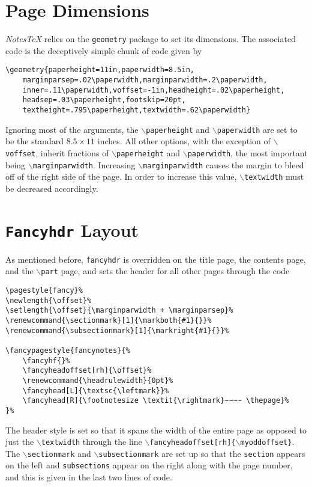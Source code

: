 \documentclass[10pt]{article}
\begin{document}
	\section{Page Dimensions}
	\textit{NotesTeX} relies on the \texttt{geometry} package to set its dimensions. The associated code is the deceptively simple chunk of code given by
	\begin{lstlisting}
\geometry{paperheight=11in,paperwidth=8.5in,
	marginparsep=.02\paperwidth,marginparwidth=.2\paperwidth,
	inner=.11\paperwidth,voffset=-1in,headheight=.02\paperheight,
	headsep=.03\paperheight,footskip=20pt,
	textheight=.795\paperheight,textwidth=.62\paperwidth}
	\end{lstlisting}
	Ignoring most of the arguments, the \texttt{$\backslash$paperheight} and \texttt{$\backslash$paperwidth} are set to be the standard $8.5\times11$ inches. All other options, with the exception of \texttt{$\backslash$voffset}, inherit fractions of \texttt{$\backslash$paperheight} and \texttt{$\backslash$paperwidth}, the most important being \texttt{$\backslash$marginparwidth}. Increasing \texttt{$\backslash$marginparwidth} causes the margin to bleed off of the right side of the page. In order to increase this value, \texttt{$\backslash$textwidth} must be decreased accordingly.


	\section{\texttt{Fancyhdr} Layout}
	As mentioned before, \texttt{fancyhdr} is overridden on the title page, the contents page, and the \texttt{$\backslash$part} page, and sets the header for all other pages through the code
	\begin{lstlisting}
\pagestyle{fancy}%
\newlength{\offset}%
\setlength{\offset}{\marginparwidth + \marginparsep}%
\renewcommand{\sectionmark}[1]{\markboth{#1}{}}%
\renewcommand{\subsectionmark}[1]{\markright{#1}{}}%

\fancypagestyle{fancynotes}{%
	\fancyhf{}%
	\fancyheadoffset[rh]{\offset}%
	\renewcommand{\headrulewidth}{0pt}%
	\fancyhead[L]{\textsc{\leftmark}}%
	\fancyhead[R]{\footnotesize \textit{\rightmark}~~~~ \thepage}%
}%
	\end{lstlisting}
	The header style is set so that it spans the width of the entire page as opposed to just the \texttt{$\backslash$textwidth} through the line \texttt{$\backslash$fancyheadoffset[rh]\{$\backslash$myoddoffset\}}. The \texttt{$\backslash$sectionmark} and \texttt{$\backslash$subsectionmark} are set up so that the \texttt{section} appears on the left and \texttt{subsections} appear on the right along with the page number, and this is given in the last two lines of code.
\end{document}

